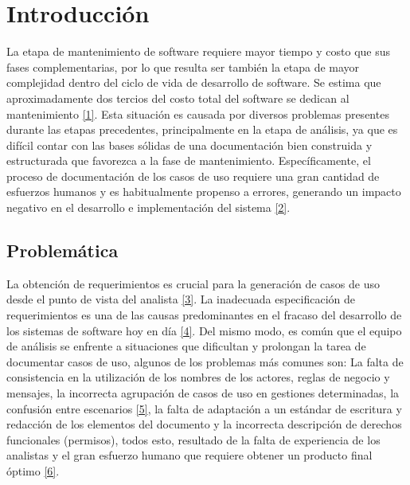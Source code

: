 

\chapter{Introducción}

La etapa de mantenimiento de software requiere mayor tiempo y costo que sus fases complementarias, por lo que resulta ser también la etapa de mayor complejidad dentro del ciclo de vida de desarrollo de software. Se estima que aproximadamente dos tercios del costo total del software se dedican al mantenimiento \hyperlink{b01}{[1]}. Esta situación es causada por diversos problemas presentes durante las etapas precedentes, principalmente en la etapa de análisis, ya que es difícil contar con las bases sólidas de una documentación bien construida y estructurada que favorezca a la fase de  mantenimiento. Específicamente, el proceso de documentación de los casos de uso requiere una gran cantidad de esfuerzos humanos y es habitualmente propenso a errores, generando un impacto negativo en el desarrollo e implementación del sistema \hyperlink{b02}{[2]}. 


\section{Problemática}

La obtención de requerimientos es crucial para la generación de casos de uso desde el punto de vista del analista \hyperlink{b03}{[3]}. La inadecuada especificación de requerimientos es una de las causas predominantes en el fracaso del desarrollo de los sistemas de software hoy en día \hyperlink{b04}{[4]}. Del mismo modo, es común que el equipo de análisis se enfrente a situaciones que dificultan y prolongan la tarea de documentar casos de uso, algunos de los problemas más comunes son: La falta de consistencia en la utilización de los nombres de los actores, reglas de negocio y mensajes, la incorrecta agrupación de casos de uso en gestiones determinadas, la confusión entre escenarios \hyperlink{b05}{[5]}, la falta de adaptación a un estándar de escritura y redacción de los elementos del documento y la incorrecta descripción de derechos funcionales (permisos),  todos esto, resultado de la falta de experiencia de los analistas y el gran esfuerzo humano que requiere obtener un producto final óptimo \hyperlink{b06}{[6]}.


	
